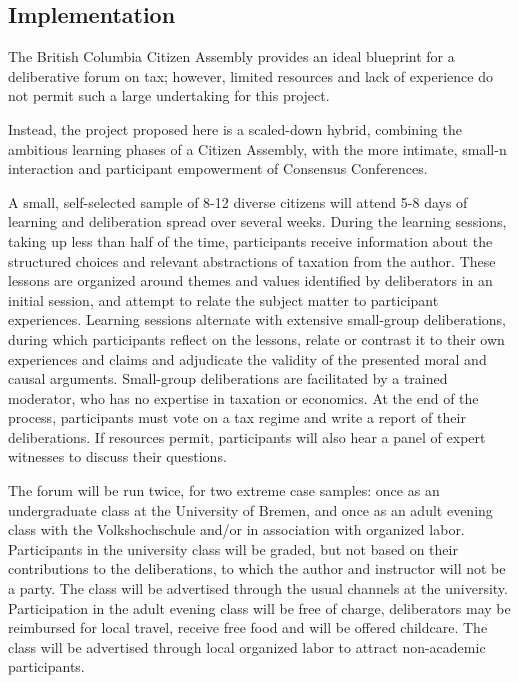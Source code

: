 \subsection{Implementation} 

The British Columbia Citizen Assembly provides an ideal blueprint for a deliberative forum on tax; however, limited resources and lack of experience do not permit such a large undertaking for this project.

Instead, the project proposed here is a scaled-down hybrid, combining the ambitious learning phases of a Citizen Assembly, with the more intimate, small-n interaction and participant empowerment of Consensus Conferences.

A small, self-selected sample of 8-12 diverse citizens will attend 5-8 days of learning and deliberation spread over several weeks. 
During the learning sessions, taking up less than half of the time, participants receive information about the structured choices and relevant abstractions of taxation from the author.
These lessons are organized around themes and values identified by deliberators in an initial session, and attempt to relate the subject matter to participant experiences.
Learning sessions alternate with extensive small-group deliberations, during which participants reflect on the lessons, relate or contrast it to their own experiences and claims and adjudicate the validity of the presented moral and causal arguments.
Small-group deliberations are facilitated by a trained moderator, who has no expertise in taxation or economics.
At the end of the process, participants must vote on a tax regime and write a report of their deliberations.
If resources permit, participants will also hear a panel of expert witnesses to discuss their questions.

The forum will be run twice, for two extreme case samples: once as an undergraduate class at the University of Bremen, and once as an adult evening class with the Volkshochschule and/or in association with organized labor.
Participants in the university class will be graded, but not based on their contributions to the deliberations, to which the author and instructor will not be a party. 
The class will be advertised through the usual channels at the university.
Participation in the adult evening class will be free of charge, deliberators may be reimbursed for local travel, receive free food and will be offered childcare. 
The class will be advertised through local organized labor to attract non-academic participants.




